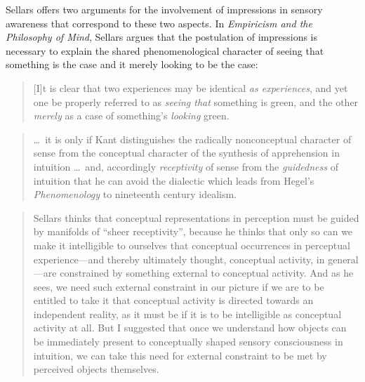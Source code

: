 \documentclass[12pt]{article}
\begin{document}
Sellars offers two arguments for the involvement of impressions in sensory awareness that correspond to these two aspects. In \emph{Empiricism and the Philosophy of Mind}, Sellars argues that the postulation of impressions is necessary to explain the shared phenomenological character of seeing that something is the case and it merely looking to be the case:
\begin{quote}
    [I]t is clear that two experiences may be identical \emph{as experiences}, and yet one be properly referred to as \emph{seeing that} something is green, and the other \emph{merely} as a case of something's \emph{looking} green. \citep[§16]{Sellars:1956xp}
\end{quote}


\begin{quote}
    \ldots\ it is only if Kant distinguishes the radically nonconceptual character of sense from the conceptual character of the synthesis of apprehension in intuition \ldots\ and, accordingly \emph{receptivity} of sense from the \emph{guidedness} of intuition that he can avoid the dialectic which leads from Hegel's \emph{Phenomenology} to nineteenth century idealism. \citep[16]{Sellars:1967uq}
\end{quote}

\begin{quote}
    Sellars thinks that conceptual representations in perception must be guided by manifolds of ``sheer receptivity'', because he thinks that only so can we make it intelligible to ourselves that conceptual occurrences in perceptual experience---and thereby ultimately thought, conceptual activity, in general---are constrained by something external to conceptual activity. And as he sees, we need such external constraint in our picture if we are to be entitled to take it that conceptual activity is directed towards an independent reality, as it must be if it is to be intelligible as conceptual activity at all. But I suggested that once we understand how objects can be immediately present to conceptually shaped sensory consciousness in intuition, we can take this need for external constraint to be met by perceived objects themselves. \citep[46]{McDowell:1998vn}
\end{quote}

\end{document}
